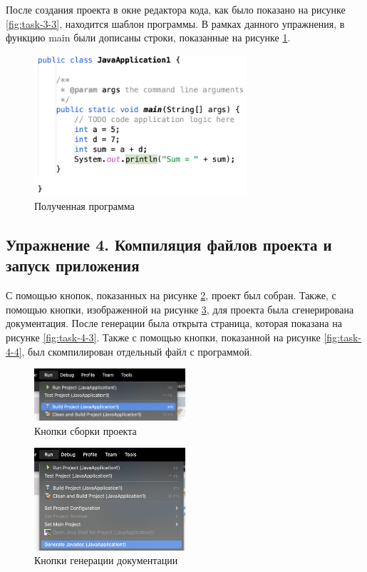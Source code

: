 \documentclass[a4paper, 14pt]{extarticle}
\begin{document}
После создания проекта в окне редактора кода, как было показано на рисунке
\ref{fig:task-3-3}, находится шаблон программы. В рамках данного упражнения, в
функцию \foreignlanguage{english}{main} были дописаны строки, показанные на
рисунке \ref{fig:task-3-4}.

\begin{figure}[H]
  \centering
  \includegraphics[width=0.7\textwidth]{images/task-3/4.png}
  \caption{Полученная программа}
  \label{fig:task-3-4}
\end{figure}

\subsection*{Упражнение 4. Компиляция файлов проекта и запуск приложения}

С помощью кнопок, показанных на рисунке \ref{fig:task-4-1}, проект был собран.
Также, с помощью кнопки, изображенной на рисунке \ref{fig:task-4-2}, для проекта
была сгенерирована документация. После генерации была открыта страница, которая
показана на рисунке \ref{fig:task-4-3}. Также с помощью кнопки, показанной на
рисунке \ref{fig:task-4-4}, был скомпилирован отдельный файл с программой.

\begin{figure}[H]
  \centering
  \includegraphics[width=0.5\textwidth]{images/task-4/1.png}
  \caption{Кнопки сборки проекта}
  \label{fig:task-4-1}
\end{figure}

\begin{figure}[H]
  \centering
  \includegraphics[width=0.5\textwidth]{images/task-4/2.png}
  \caption{Кнопки генерации документации}
  \label{fig:task-4-2}
\end{figure}
\end{document}
